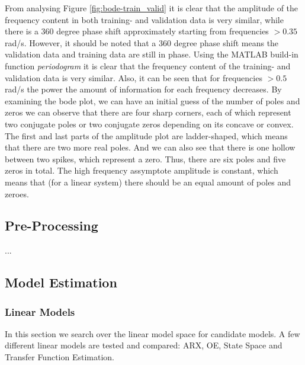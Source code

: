 \documentclass[]{article}
\begin{document}
From analysing Figure \ref{fig:bode-train_valid} it is clear that the amplitude of the frequency content in both training- and validation data is very similar, while there is a 360 degree phase shift approximately starting from frequencies $>0.35$ rad/s. However, it should be noted that a 360 degree phase shift means the validation data and training data are still in phase. Using the MATLAB build-in function \emph{periodogram} it is clear that the frequency content of the training- and validation data is very similar. Also, it can be seen that for frequencies $> 0.5$ rad/s the power the amount of information for each frequency decreases. By examining the bode plot, we can have an initial guess of the number of poles and zeros we can observe that there are four sharp corners, each of which represent two conjugate poles or two conjugate zeros depending on its concave or convex. The first and last parts of the amplitude plot are ladder-shaped, which means that there are two more real poles. And we can also see that there is one hollow between two spikes, which represent a zero. Thus, there are six poles and five zeros in total. The high frequency assymptote amplitude is constant, which means that (for a linear system) there should be an equal amount of poles and zeroes.

\subsection{Pre-Processing}
...

\subsection{Model Estimation}
\subsubsection{Linear Models}
 In this section we search over the linear model space for candidate models. A few different linear models are tested and compared: ARX, OE, State Space and Transfer Function Estimation. 
\end{document}
